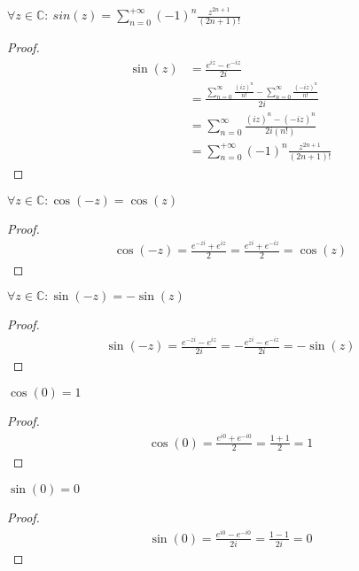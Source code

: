 \documentclass[main.tex]{subfiles}
\begin{document}
\begin{bpr}
  $\forall z \in \mathbb{C}:\ sin(z) = \sum_{n=0}^{+\infty}(-1)^{n}\frac{z^{2n+1}}{(2n+1)!}$

  \begin{proof}
    \begin{align*}
      \sin(z)
      &= \frac{e^{iz} - e^{-iz}}{2i}\\
      &= \frac{\sum_{n=0}^{\infty}\frac{(iz)^{n}}{n!} - \sum_{n=0}^{\infty}\frac{(-iz)^{n}}{n!}}{2i}\\
      &= \sum_{n=0}^{\infty}\frac{(iz)^{n} - (-iz)^{n}}{2i(n!)}\\
      &= \sum_{n=0}^{+\infty}(-1)^{n}\frac{z^{2n+1}}{(2n+1)!}
    \end{align*}
  \end{proof}
\end{bpr}

\begin{bpr}
  $\forall z \in \mathbb{C}: \cos(-z) = \cos(z)$

  \begin{proof}
    \begin{align*}
      \cos(-z)
      = \frac{e^{-zi} + e^{iz}}{2}
      = \frac{e^{zi} + e^{-iz}}{2}
      = \cos(z)
    \end{align*}
  \end{proof}
\end{bpr}

\begin{bpr}
  $\forall z \in \mathbb{C}: \sin(-z) = -\sin(z)$

  \begin{proof}
    \begin{align*}
      \sin(-z)
      = \frac{e^{-zi} - e^{iz}}{2i}
      = -\frac{e^{zi} - e^{-iz}}{2i}
      = -\sin(z)
    \end{align*}
  \end{proof}
\end{bpr}

\begin{bpr}
  $\cos(0) = 1$

  \begin{proof}
    \begin{align*}
      \cos(0)
      = \frac{e^{i0} + e^{-i0}}{2}
      = \frac{1+1}{2}
      = 1
    \end{align*}
  \end{proof}
\end{bpr}

\begin{bpr}
  $\sin(0) = 0$
  \begin{proof}
    \begin{align*}
      \sin(0)
      = \frac{e^{i0} - e^{-i0}}{2i}
      = \frac{1-1}{2i}
      = 0
    \end{align*}
  \end{proof}
\end{bpr}
\end{document}

